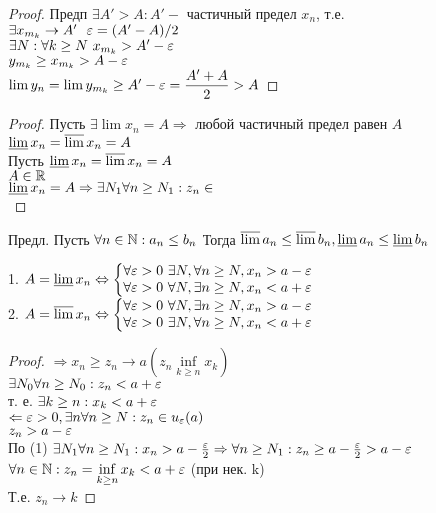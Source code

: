 \begin{definition}
\begin{theorem}
\begin{proof}
			Предп $ \exists A' > A : A' - $ частичный предел $ x_n $, т.е. $ \exists x_{m_k} \rightarrow A' \ \  \varepsilon = (A' - A) / 2 $ \\
			$ \exists N : \forall k \geq N \ x_{m_k} > A' - \varepsilon $ \\
			$ y_{m_k} \geq x_{m_k} > A - \varepsilon $ \\
			$ \lim y_n = \lim y_{m_k} \geq A' - \varepsilon = \dfrac{A'+A}{2} > A $
		\end{proof}
		\begin{proof}
			Пусть $ \exists \lim x_n = A \Rightarrow $ любой частичный предел равен $ A $  \\
			$ \varliminf x_n = \varlimsup x_n = A $\\
			Пусть $ \varliminf x_n = \varlimsup x_n = A $ \\
			$ A \in \mathbb{R} $ \\
			$ \varliminf x_n = A \Rightarrow \exists N_1 \forall n \geq N_1 : z_n \in  $ \\%
		\end{proof}
	\end{theorem}
\end{definition}
Предл. Пусть $ \forall n \in \mathbb{N} : a_n \leq b_n $ Тогда $\varlimsup a_n \leq \varlimsup b_n, \varliminf a_n \leq \varliminf b_n $ \\
\begin{theorem}
	1. $ A = \varliminf x_n  \Leftrightarrow \left\{ \begin{matrix}
	\forall \varepsilon > 0 \  \exists N, \forall n \geq N, x_n > a - \varepsilon \\
	\forall \varepsilon > 0 \  \forall N, \exists n \geq N , x_n  < a + \varepsilon 
	\end{matrix}  \right. $\\
	2. $ A = \varlimsup x_n  \Leftrightarrow \left\{ \begin{matrix}
	\forall \varepsilon > 0 \ \forall N, \exists n \geq N, x_n > a - \varepsilon \\
	\forall \varepsilon > 0 \  \exists N, \forall n \geq N , x_n  < a + \varepsilon 
	\end{matrix} \right.  $ \\
	\begin{proof}
		$ \Rightarrow x_n \geq z_n \rightarrow a (z_n  \inf\limits_{k \geq n} x_k) $\\
		$ \exists N_0 \forall n \geq N_0 : z_n < a + \varepsilon  $ \\
		т. е. $ \exists k \geq n : x_k < a + \varepsilon $ \\
		$ \Leftarrow \varepsilon > 0, \exists n \forall n \geq N : z_n \in u_{\varepsilon}(a) $\\
		$ z_n > a - \varepsilon $ \\
		По (1) $ \exists N_1 \forall n \geq N_1 : x_n > a - \frac{\varepsilon}{2} \Rightarrow \forall n \geq N_1 : z_n \geq a - \frac{\varepsilon }{2} > a - \varepsilon $ \\
		$ \forall n \in \mathbb{N} : z_n = \inf\limits_{k \geq n} x_k < a + \varepsilon $ (при нек. k) \\
		Т.е. $ z_n \rightarrow k $
	\end{proof}
\end{theorem} 
